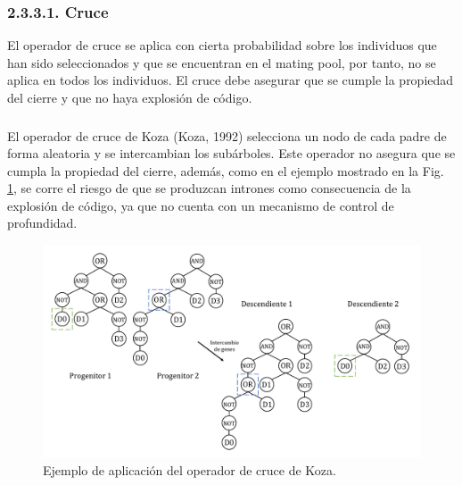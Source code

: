 \documentclass[spanish,a4paper,12pt,twoside]{report}
\begin{document}
      \subsubsection*{\normalsize 2.3.3.1. Cruce}
      El operador de cruce se aplica con cierta probabilidad sobre los individuos que han sido seleccionados y que se encuentran en el mating pool, por tanto, no se aplica en todos los individuos. El cruce debe asegurar que se cumple la propiedad del cierre y que no haya explosión de código. \par
      
        \subsubsection*{\vspace{-0.5cm}{\normalsize Operador de Koza}}
        \vspace{-0.5cm}
        El operador de cruce de Koza (Koza, 1992) selecciona un nodo de cada padre de forma aleatoria y se intercambian los subárboles. Este operador no asegura que se cumpla la propiedad del cierre, además, como en el ejemplo mostrado en la Fig. \ref{fig:3}, se corre el riesgo de que se produzcan intrones como consecuencia de la explosión de código, ya que no cuenta con un mecanismo de control de profundidad. \vfill
        \begin{figure}[H]
          \centering
          \includegraphics[width = 1\textwidth]{resources/Fig3.pdf}
          \caption{Ejemplo de aplicación del operador de cruce de Koza.}
          \label{fig:3}
        \end{figure} \par
        
\end{document}
